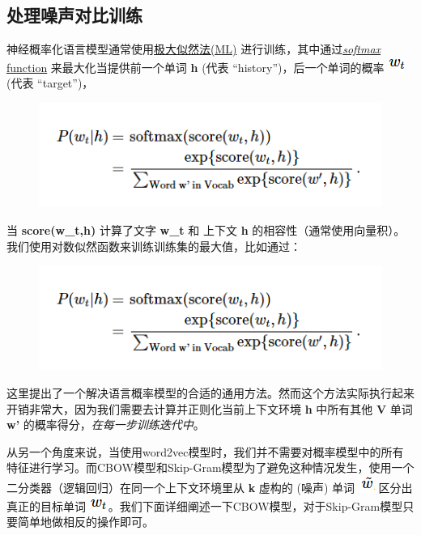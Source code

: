 \subsection{处理噪声对比训练}\label{ux5904ux7406ux566aux58f0ux5bf9ux6bd4ux8badux7ec3}

神经概率化语言模型通常使用\href{https://en.wikipedia.org/wiki/Maximum_likelihood}{极大似然法(ML)} 进行训练，其中通过\href{https://en.wikipedia.org/wiki/Softmax_function}{\emph{softmax}
function} 来最大化当提供前一个单词 \textbf{h} (代表
``history'')，后一个单词的概率 \includegraphics{../SOURCE/images/vr1.png} (代表
``target'')，

\begin{figure}[htbp]
\centering
\includegraphics{../SOURCE/images/vr2.png}
\caption{}
\end{figure}

当 \textbf{score(w\_t,h)} 计算了文字 \textbf{w\_t} 和 上下文 \textbf{h}
的相容性（通常使用向量积）。我们使用对数似然函数来训练训练集的最大值，比如通过：

\begin{figure}[htbp]
\centering
\includegraphics{../SOURCE/images/vr2.png}
\caption{}
\end{figure}

这里提出了一个解决语言概率模型的合适的通用方法。然而这个方法实际执行起来开销非常大，因为我们需要去计算并正则化当前上下文环境
\textbf{h} 中所有其他 \textbf{V} 单词 \textbf{w'}
的概率得分，\emph{在每一步训练迭代中}。

从另一个角度来说，当使用word2vec模型时，我们并不需要对概率模型中的所有特征进行学习。而CBOW模型和Skip-Gram模型为了避免这种情况发生，使用一个二分类器（逻辑回归）在同一个上下文环境里从
\textbf{k} 虚构的 (噪声) 单词 \includegraphics{../SOURCE/images/rw5.png}
区分出真正的目标单词
\includegraphics{../SOURCE/images/rw4.png}。我们下面详细阐述一下CBOW模型，对于Skip-Gram模型只要简单地做相反的操作即可。

